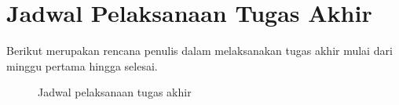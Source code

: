 \section{Jadwal Pelaksanaan Tugas Akhir}

Berikut merupakan rencana penulis dalam melaksanakan tugas akhir mulai dari minggu pertama hingga selesai.


\begin{figure}[h]
  \centering
  \qquad
  \caption{Jadwal pelaksanaan tugas akhir}
\end{figure}